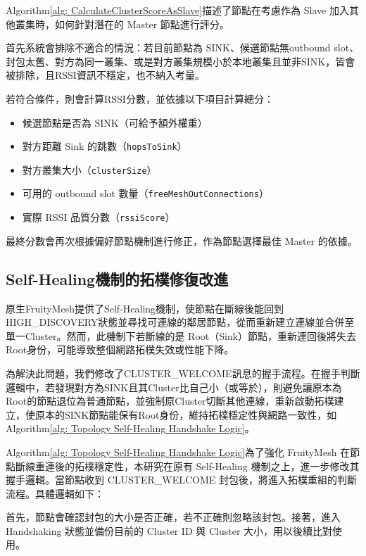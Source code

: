\begin{ZhChapter}
Algorithm\ref{alg: CalculateClusterScoreAsSlave}描述了節點在考慮作為 Slave 加入其他叢集時，如何針對潛在的 Master 節點進行評分。

首先系統會排除不適合的情況：若目前節點為 SINK、候選節點無outbound slot、封包太舊、對方為同一叢集、或是對方叢集規模小於本地叢集且並非SINK，皆會被排除，且RSSI資訊不穩定，也不納入考量。

若符合條件，則會計算RSSI分數，並依據以下項目計算總分：

\begin{itemize}
    \item 候選節點是否為 SINK（可給予額外權重）
    \item 對方距離 Sink 的跳數（\texttt{hopsToSink}）
    \item 對方叢集大小（\texttt{clusterSize}）
    \item 可用的 outbound slot 數量（\texttt{freeMeshOutConnections}）
    \item 實際 RSSI 品質分數（\texttt{rssiScore}）
\end{itemize}

最終分數會再次根據偏好節點機制進行修正，作為節點選擇最佳 Master 的依據。


\subsection{Self-Healing機制的拓樸修復改進}

原生FruityMesh提供了Self-Healing機制，使節點在斷線後能回到HIGH\_DISCOVERY狀態並尋找可連線的鄰居節點，從而重新建立連線並合併至單一Cluster。然而，此機制下若斷線的是 Root（Sink）節點，重新連回後將失去Root身份，可能導致整個網路拓樸失效或性能下降。

為解決此問題，我們修改了CLUSTER\_WELCOME訊息的握手流程。在握手判斷邏輯中，若發現對方為SINK且其Cluster比自己小（或等於），則避免讓原本為Root的節點退位為普通節點，並強制原Cluster切斷其他連線，重新啟動拓樸建立，使原本的SINK節點能保有Root身份，維持拓樸穩定性與網路一致性，如Algorithm\ref{alg: Topology Self-Healing Handshake Logic}。



Algorithm\ref{alg: Topology Self-Healing Handshake Logic}為了強化 FruityMesh 在節點斷線重連後的拓樸穩定性，本研究在原有 Self-Healing 機制之上，進一步修改其握手邏輯。當節點收到 CLUSTER\_WELCOME 封包後，將進入拓樸重組的判斷流程。具體邏輯如下：

首先，節點會確認封包的大小是否正確，若不正確則忽略該封包。接著，進入 Handshaking 狀態並備份目前的 Cluster ID 與 Cluster 大小，用以後續比對使用。


\end{ZhChapter}
